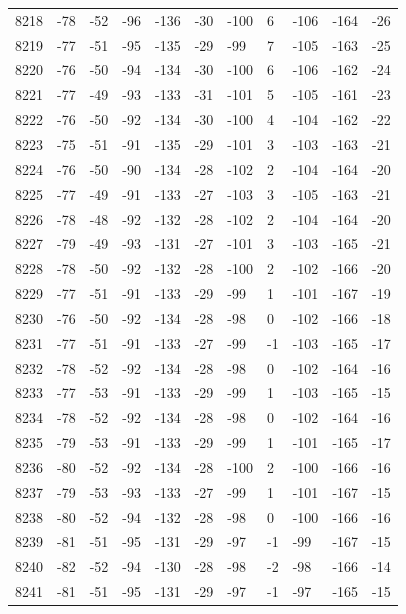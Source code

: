 \begin{table}[H]
\begin{tabular}{lllllllllll}
8218 & -78 & -52 & -96 & -136 & -30 & -100 & 6 & -106 & -164 & -26 \\
8219 & -77 & -51 & -95 & -135 & -29 & -99 & 7 & -105 & -163 & -25 \\
8220 & -76 & -50 & -94 & -134 & -30 & -100 & 6 & -106 & -162 & -24 \\
8221 & -77 & -49 & -93 & -133 & -31 & -101 & 5 & -105 & -161 & -23 \\
8222 & -76 & -50 & -92 & -134 & -30 & -100 & 4 & -104 & -162 & -22 \\
8223 & -75 & -51 & -91 & -135 & -29 & -101 & 3 & -103 & -163 & -21 \\
8224 & -76 & -50 & -90 & -134 & -28 & -102 & 2 & -104 & -164 & -20 \\
8225 & -77 & -49 & -91 & -133 & -27 & -103 & 3 & -105 & -163 & -21 \\
8226 & -78 & -48 & -92 & -132 & -28 & -102 & 2 & -104 & -164 & -20 \\
8227 & -79 & -49 & -93 & -131 & -27 & -101 & 3 & -103 & -165 & -21 \\
8228 & -78 & -50 & -92 & -132 & -28 & -100 & 2 & -102 & -166 & -20 \\
8229 & -77 & -51 & -91 & -133 & -29 & -99 & 1 & -101 & -167 & -19 \\
8230 & -76 & -50 & -92 & -134 & -28 & -98 & 0 & -102 & -166 & -18 \\
8231 & -77 & -51 & -91 & -133 & -27 & -99 & -1 & -103 & -165 & -17 \\
8232 & -78 & -52 & -92 & -134 & -28 & -98 & 0 & -102 & -164 & -16 \\
8233 & -77 & -53 & -91 & -133 & -29 & -99 & 1 & -103 & -165 & -15 \\
8234 & -78 & -52 & -92 & -134 & -28 & -98 & 0 & -102 & -164 & -16 \\
8235 & -79 & -53 & -91 & -133 & -29 & -99 & 1 & -101 & -165 & -17 \\
8236 & -80 & -52 & -92 & -134 & -28 & -100 & 2 & -100 & -166 & -16 \\
8237 & -79 & -53 & -93 & -133 & -27 & -99 & 1 & -101 & -167 & -15 \\
8238 & -80 & -52 & -94 & -132 & -28 & -98 & 0 & -100 & -166 & -16 \\
8239 & -81 & -51 & -95 & -131 & -29 & -97 & -1 & -99 & -167 & -15 \\
8240 & -82 & -52 & -94 & -130 & -28 & -98 & -2 & -98 & -166 & -14 \\
8241 & -81 & -51 & -95 & -131 & -29 & -97 & -1 & -97 & -165 & -15 \\

\end{tabular}
\end{table}
